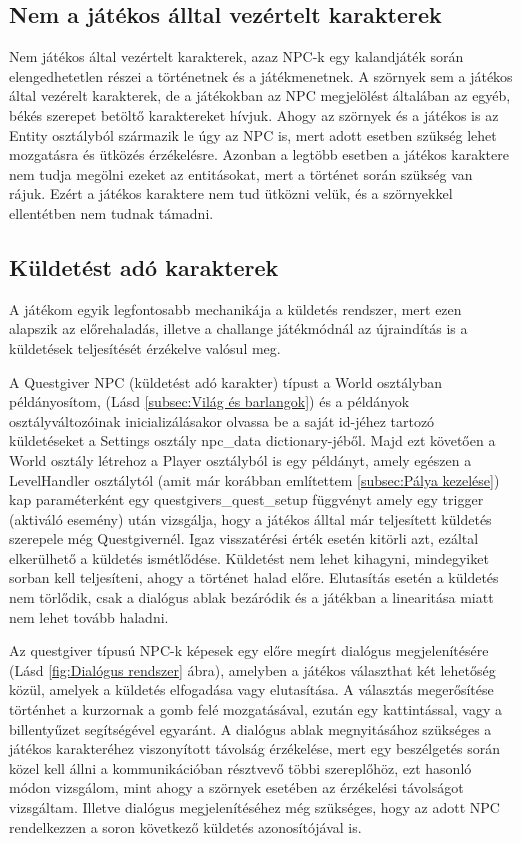 \subsection{Nem a játékos álltal vezértelt karakterek}
\indent \indent Nem játékos által vezértelt karakterek, azaz NPC-k egy kalandjáték során elengedhetetlen részei a történetnek és a játékmenetnek. A szörnyek sem a játékos által vezérelt karakterek, de a játékokban az NPC megjelölést általában az egyéb, békés szerepet betöltő karaktereket hívjuk. Ahogy az szörnyek és a játékos is az Entity osztályból származik le úgy az NPC is, mert adott esetben szükség lehet mozgatásra és ütközés érzékelésre. Azonban a legtöbb esetben a játékos karaktere nem tudja megölni ezeket az entitásokat, mert a történet során szükség van rájuk. Ezért a játékos karaktere nem tud ütközni velük, és a szörnyekkel ellentétben nem tudnak támadni.


\subsection{Küldetést adó karakterek}

\indent \indent A játékom egyik legfontosabb mechanikája a küldetés rendszer, mert ezen alapszik az előrehaladás, illetve a challange játékmódnál az újraindítás is a küldetések teljesítését érzékelve valósul meg. 

A Questgiver NPC (küldetést adó karakter) típust a World osztályban példányosítom, (Lásd \ref{subsec:Világ és barlangok}) és
 a példányok osztályváltozóinak inicializálásakor olvassa be a saját id-jéhez tartozó küldetéseket a Settings osztály npc\_data dictionary-jéből.
  Majd ezt követően a World osztály létrehoz a Player osztályból is egy példányt,
   amely egészen a LevelHandler osztálytól (amit már korábban említettem \ref{subsec:Pálya kezelése}) kap
    paraméterként egy questgivers\_quest\_setup függvényt amely egy trigger (aktiváló esemény) után vizsgálja,
     hogy a játékos álltal már teljesített küldetés szerepel\-e még Questgivernél. Igaz visszatérési érték esetén kitörli azt,
      ezáltal elkerülhető a küldetés ismétlődése. Küldetést nem lehet kihagyni, mindegyiket sorban kell teljesíteni,
       ahogy a történet halad előre. Elutasítás esetén a küldetés nem törlődik, csak a dialógus ablak bezáródik és a játékban a linearitása miatt nem lehet tovább haladni.

Az questgiver típusú NPC-k képesek egy előre megírt dialógus megjelenítésére (Lásd \ref{fig:Dialógus rendszer} ábra), amelyben a játékos választhat két lehetőség közül, amelyek a küldetés elfogadása vagy elutasítása. A választás megerősítése történhet a kurzornak a gomb felé mozgatásával, ezután egy kattintással, vagy a billentyűzet segítségével egyaránt. A dialógus ablak megnyitásához szükséges a játékos karakteréhez viszonyított távolság érzékelése, mert egy beszélgetés során közel kell állni a kommunikációban résztvevő többi szereplőhöz, ezt hasonló módon vizsgálom, mint ahogy a szörnyek esetében az érzékelési távolságot vizsgáltam. Illetve dialógus megjelenítéséhez még szükséges, hogy az adott NPC rendelkezzen a soron következő küldetés azonosítójával is.   

